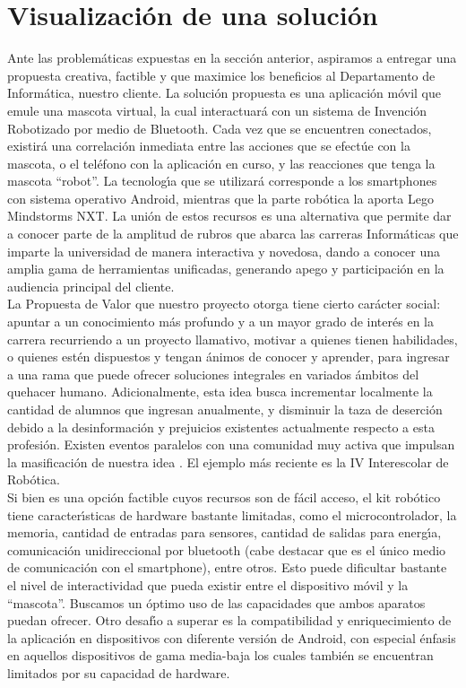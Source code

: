 \documentclass[letterpaper,12pt]{report} %
\numberwithin{equation}{section} %
\numberwithin{figure}{section} %
\numberwithin{table}{section} %
\begin{document}
\section{Visualizaci\'on de una soluci\'on}
Ante las problem\'aticas expuestas en la secci\'on anterior, aspiramos a entregar una propuesta creativa, factible y que maximice los beneficios al Departamento de Inform\'atica, nuestro cliente. La soluci\'on propuesta es una aplicaci\'on m\'ovil que emule una mascota virtual, la cual interactuar\'a con un sistema de Invenci\'on Robotizado por medio de Bluetooth. Cada vez que se encuentren conectados, existir\'a una correlaci\'on inmediata entre las acciones que se efect\'ue con la mascota, o el tel\'efono con la aplicaci\'on en curso, y las reacciones que tenga la mascota ``robot''. La tecnolog\'{\i}a que se utilizar\'a corresponde a los smartphones con sistema operativo Android, mientras que la parte rob\'otica la aporta Lego Mindstorms NXT. La uni\'on de estos recursos es una alternativa que permite dar a conocer parte de la amplitud de rubros que abarca las carreras Inform\'aticas que imparte la universidad de manera interactiva y novedosa, dando a conocer una amplia gama de herramientas unificadas, generando apego y participaci\'on en la audiencia principal del cliente.\\

La Propuesta de Valor que nuestro proyecto otorga tiene cierto car\'acter social: apuntar a un conocimiento m\'as profundo y a un mayor grado de  inter\'es en la carrera recurriendo a un proyecto llamativo, motivar a quienes tienen habilidades, o quienes est\'en dispuestos y tengan \'animos de conocer y aprender, para ingresar a una rama que puede ofrecer soluciones integrales en variados \'ambitos del quehacer humano. Adicionalmente, esta idea busca incrementar localmente la cantidad de alumnos que ingresan anualmente, y disminuir la taza de deserci\'on debido a la desinformaci\'on y prejuicios existentes actualmente respecto a esta profesi\'on. Existen eventos paralelos con una comunidad muy activa que impulsan la masificaci\'on de nuestra idea . El ejemplo m\'as reciente es la IV Interescolar de Rob\'otica.\\

Si bien es una opci\'on factible cuyos recursos son de f\'acil acceso,  el kit rob\'otico tiene caracter\'{\i}sticas de hardware bastante limitadas, como el microcontrolador, la memoria, cantidad de entradas para sensores, cantidad de salidas para energ\'{\i}a, comunicaci\'on unidireccional por bluetooth (cabe destacar que es el \'unico medio de comunicaci\'on con el smartphone), entre otros. Esto puede dificultar bastante el nivel de interactividad que pueda existir entre el dispositivo m\'ovil y la ``mascota''. Buscamos un \'optimo uso de las capacidades que ambos aparatos puedan ofrecer. Otro desaf\'{\i}o a superar  es la compatibilidad y enriquecimiento de la aplicaci\'on en dispositivos con diferente versi\'on de Android, con especial \'enfasis en aquellos dispositivos de gama media-baja los cuales tambi\'en se encuentran limitados por su capacidad de hardware. \\
\end{document}
